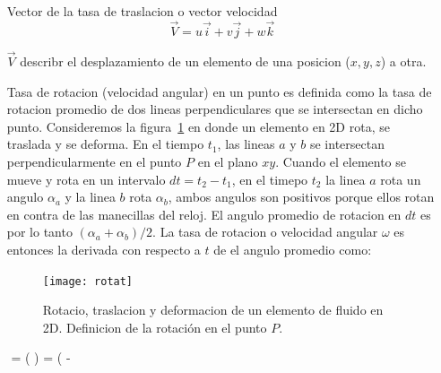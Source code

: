 \documentclass[10pt, oneside]{article}
\begin{document}
\begin{itemize}
\item[Vector de la tasa de traslacion o vector velocidad]
$$
\vec{V}=u\vec{i}+v\vec{j}+w\vec{k}
$$

$\vec{V}$ describr el desplazamiento de un elemento de una posicion ($x,y,z$) a otra.

\item[Tasa de rotacion (velocidad angular)] en un punto es definida como la tasa de rotacion promedio de dos lineas perpendiculares que se intersectan en dicho punto. Consideremos la figura~\ref{rotat} en donde un elemento en 2D rota, se traslada y se deforma. En el tiempo $t_1$,  las lineas $a$ y $b$ se intersectan perpendicularmente en el punto $P$ en el plano $xy$. Cuando el elemento se mueve y rota en un intervalo $dt=t_2 - t_1$, en el timepo $t_2$ la linea $a$ rota un angulo $\alpha_a$ y la linea $b$ rota $\alpha_b$, ambos angulos son positivos porque ellos rotan en contra de las manecillas del reloj. El angulo promedio de rotacion en $dt$ es por lo tanto $(\alpha_a +\alpha_b)/2$. La tasa de rotacion  o velocidad angular $\omega$ es entonces la derivada con respecto a $t$ de el angulo promedio como:
\begin{figure}[h]
\centering
\texttt{[image: rotat]}
\caption{Rotacio, traslacion y deformacion de un elemento de fluido en 2D. Definicion de la rotaci\'on en el punto $P$.}
\label{rotat}
\end{figure}

$$
\omega = \left(  \right) =  \left( -




\end{itemize}
\end{document}

